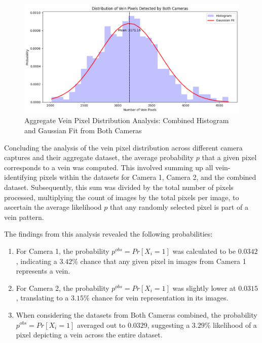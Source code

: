 \begin{enumerate}
    \begin{figure}[H]
        \centering
        \includegraphics[width=1\linewidth]{latex-img/distribution_veins_bothcams.png}
        \caption{Aggregate Vein Pixel Distribution Analysis: Combined Histogram and Gaussian Fit from Both Cameras}
        \label{distribution_veins_bothcams}
    \end{figure}

\end{enumerate}

Concluding the analysis of the vein pixel distribution across different camera captures and their aggregate dataset, the average probability \(p\) that a given pixel corresponds to a vein was computed. This involved summing up all vein-identifying pixels within the datasets for Camera 1, Camera 2, and the combined dataset. Subsequently, this sum was divided by the total number of pixels processed, multiplying the count of images by the total pixels per image, to ascertain the average likelihood \(p\) that any randomly selected pixel is part of a vein pattern.

The findings from this analysis revealed the following probabilities:
\begin{enumerate}
    \item For Camera 1, the probability \(p^{obs} = Pr[X_i = 1]\) was calculated to be \(0.0342\), indicating a \(3.42\)\% chance that any given pixel in images from Camera 1 represents a vein.

    \item For Camera 2, the probability \(p^{obs} = Pr[X_i = 1]\) was slightly lower at \(0.0315\), translating to a \(3.15\)\% chance for vein representation in its images.

    \item When considering the datasets from Both Cameras combined, the probability \(p^{obs} = Pr[X_i = 1]\) averaged out to \(0.0329\), suggesting a \(3.29\)\% likelihood of a pixel depicting a vein across the entire dataset.
    
\end{enumerate}

